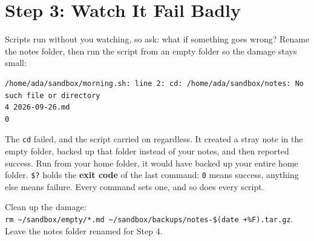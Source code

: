 
\section{Step 3: Watch It Fail Badly}\label{09-lab-automate-a-daily-chore:step-3-watch-it-fail-badly}

Scripts run without you watching, so ask: what if something goes wrong? Rename the notes folder, then run the script from an empty folder so the damage stays small:

\begin{codeblock}

\begin{Shaded}
\begin{Highlighting}[]
 
 
\end{Highlighting}
\end{Shaded}

\end{codeblock}

\begin{codeblock}
\begin{Verbatim}[formatcom=\outputstyle]
/home/ada/sandbox/morning.sh: line 2: cd: /home/ada/sandbox/notes: No such file or directory
4 2026-09-26.md
0
\end{Verbatim}
\end{codeblock}

The \texttt{cd} failed, and the script carried on regardless. It created a stray note in the empty folder, backed up that folder instead of your notes, and then reported success. Run from your home folder, it would have backed up your entire home folder. \texttt{\$?} holds the \textbf{exit code} of the last command: \texttt{0} means success, anything else means failure. Every command sets one, and so does every script.

Clean up the damage: \texttt{rm\ \textasciitilde{}/}\allowbreak{}\texttt{sandbox/}\allowbreak{}\texttt{empty/}\allowbreak{}\texttt{*.}\allowbreak{}\texttt{md\ \textasciitilde{}/}\allowbreak{}\texttt{sandbox/}\allowbreak{}\texttt{backups/}\allowbreak{}\texttt{notes-}\allowbreak{}\texttt{\$(date\ +\%F).}\allowbreak{}\texttt{tar.}\allowbreak{}\texttt{gz}. Leave the notes folder renamed for Step 4.

